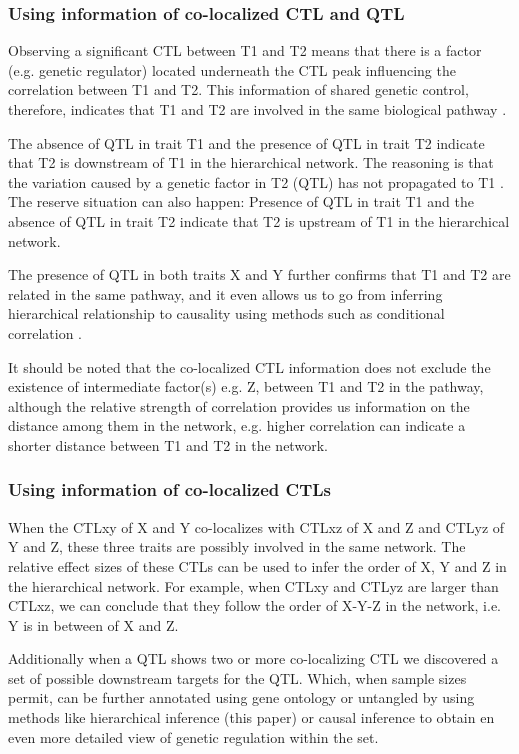   \subsubsection{Using information of co-localized CTL and QTL}
  Observing a significant CTL between T1 and T2 means that there is a factor (e.g. genetic regulator) located underneath 
  the CTL peak influencing the correlation between T1 and T2. This information of shared genetic control, therefore, 
  indicates that T1 and T2 are involved in the same biological pathway \cite{Tesson:2010}.

  The absence of QTL in trait T1 and the presence of QTL in trait T2 indicate that T2 is downstream of T1 in the 
  hierarchical network. The reasoning is that the variation caused by a genetic factor in T2 (QTL) has not 
  propagated to T1 \cite{Jansen:2009}. The reserve situation can also happen: Presence of QTL in trait T1 and the 
  absence of QTL in trait T2 indicate that T2 is upstream of T1 in the hierarchical network.

  The presence of QTL in both traits X and Y further confirms that T1 and T2 are related in the same pathway, and it 
  even allows us to go from inferring hierarchical relationship to causality using methods such as conditional 
  correlation \cite{Schadt:2007, Li:2010}.

  It should be noted that the co-localized CTL information does not exclude the existence of intermediate factor(s) 
  e.g. Z,  between T1 and T2 in the pathway, although the relative strength of correlation provides us 
  information on the distance among them in the network, e.g. higher correlation can indicate a shorter distance 
  between T1 and T2 in the network.\\

  \subsubsection{Using information of co-localized CTLs}
  When the CTLxy of X and Y co-localizes with CTLxz of X and Z and CTLyz of Y and Z, these three traits are possibly 
  involved in the same network. The relative effect sizes of these CTLs can be used to infer the order of X, Y and Z
  in the hierarchical network. For example, when CTLxy and CTLyz are larger than CTLxz, we can conclude that they 
  follow the order of X-Y-Z in the network, i.e. Y is in between of X and Z.

  Additionally when a QTL shows two or more co-localizing CTL we discovered a set of possible downstream targets 
  for the QTL. Which, when sample sizes permit, can be further annotated using gene ontology \cite{GeneOntology:2000} or 
  untangled by using methods like hierarchical inference (this paper) or causal inference \cite{Schadt:2005, Li:2006} 
  to obtain en even more detailed view of genetic regulation within the set.


